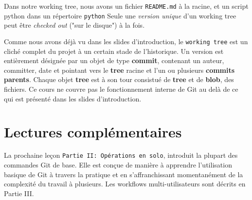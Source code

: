 \documentclass{../../common/tufte-latex/tufte-handout}
\begin{document}
Dans notre working tree, nous avons un fichier \texttt{README.md} à la racine, et un script python dans un répertoire \texttt{python}
Seule une \textit{version unique} d'un working tree peut être \textit{checked out} ("sur le disque") à la fois.

Comme nous avons déjà vu dans les slides d'introduction, le \texttt{working tree} est un cliché complet du projet à un certain stade de l'historique.
Un version est entièrement désignée par un objet de type \textbf{commit}, contenant un auteur, committer, date et pointant vers le \textbf{tree} racine et l'un ou plusieurs \textbf{commits parents}.
Chaque objet \textbf{tree} est à son tour consistué de \textbf{tree} et de \textbf{blob}, des fichiers.
Ce cours ne couvre pas le fonctionnement interne de Git au delà de ce qui est présenté dans les slides d'introduction.

\section{Lectures complémentaires}

La prochaine leçon \texttt{Partie II: Opérations en solo}, introduit la plupart des commandes Git de base. Elle est conçue de manière à apprendre l'utilisation basique de Git à travers la pratique et en s'affranchissant momentanément de la complexité du travail à plusieurs. Les workflows multi-utilisateurs sont décrits en Partie III.



\end{document}
